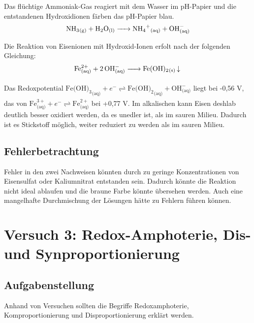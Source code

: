 \documentclass[12pt]{scrartcl} %
\begin{document}
Das flüchtige Ammoniak-Gas reagiert mit dem Wasser im pH-Papier und die entstandenen Hydroxidionen färben das pH-Papier blau.
\begin{equation}
    \ce{NH3_{\text{(g)}} + H2O_{\text{(l)}} -> NH4+_{\text{(aq)}} + OH^-_{\text{(aq)}}}
\end{equation}


Die Reaktion von Eisenionen mit Hydroxid-Ionen erfolt nach der folgenden Gleichung:
\begin{equation}
    \ce{Fe^{2+}_{(aq)} + 2OH^{-}_{(aq)} -> Fe(OH)2_{\text{(s)}} v }
\end{equation}

Das Redoxpotential ${{\text{Fe(OH)}}_3}_{\text{(aq)}} + e^- \rightleftharpoons {{\text{Fe(OH)}}_2}_{\text{(aq)}} + \text{OH}^{-}_{\text{(aq)}}$ liegt bei -0,56 V\textsuperscript{\cite{redox}}, das von $\text{Fe}^{3+}_{\text{(aq)}} + e^- \rightleftharpoons \text{Fe}^{2+}_{\text{(aq)}}$ bei +0,77 V\textsuperscript{\cite{allg_ac_buch_riedel}}. Im alkalischen kann Eisen deshlab deutlich besser oxidiert werden, da es unedler ist, als im sauren Milieu. Dadurch ist es Stickstoff möglich, weiter reduziert zu werden als im sauren Milieu. 




\subsection{Fehlerbetrachtung}
Fehler in den zwei Nachweisen könnten durch zu geringe Konzentrationen von Eisensulfat oder Kaliumnitrat entstanden sein. Dadurch könnte die Reaktion nicht ideal ablaufen und die braune Farbe könnte übersehen werden. Auch eine mangelhafte Durchmischung der Lösungen hätte zu Fehlern führen können.




\section{Versuch 3: Redox-Amphoterie, Dis- und Synproportionierung}

\subsection{Aufgabenstellung}

Anhand von Versuchen sollten die Begriffe Redoxamphoterie, Komproportionierung und Disproportionierung erklärt werden. 
\end{document}
